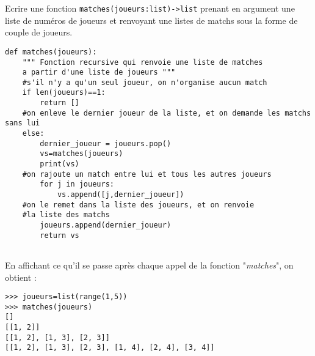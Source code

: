 \question{} Ecrire une fonction \texttt{matches(joueurs:list)->list} prenant en argument une liste de numéros de joueurs et renvoyant une listes de matchs sous la forme de couple de joueurs.

\begin{center}
\begin{lstlisting}
def matches(joueurs): 
    """ Fonction recursive qui renvoie une liste de matches
    a partir d'une liste de joueurs """ 
    #s'il n'y a qu'un seul joueur, on n'organise aucun match
    if len(joueurs)==1: 
        return [] 
    #on enleve le dernier joueur de la liste, et on demande les matchs sans lui
    else:
        dernier_joueur = joueurs.pop()
        vs=matches(joueurs) 
        print(vs)
    #on rajoute un match entre lui et tous les autres joueurs 
        for j in joueurs:
            vs.append([j,dernier_joueur]) 
    #on le remet dans la liste des joueurs, et on renvoie 
    #la liste des matchs 
        joueurs.append(dernier_joueur) 
        return vs
    
\end{lstlisting}
\end{center}


En affichant ce qu'il se passe après chaque appel de la fonction "\textit{matches}", on obtient :

\begin{lstlisting}
>>> joueurs=list(range(1,5))
>>> matches(joueurs)
[]
[[1, 2]]
[[1, 2], [1, 3], [2, 3]]
[[1, 2], [1, 3], [2, 3], [1, 4], [2, 4], [3, 4]]
\end{lstlisting}